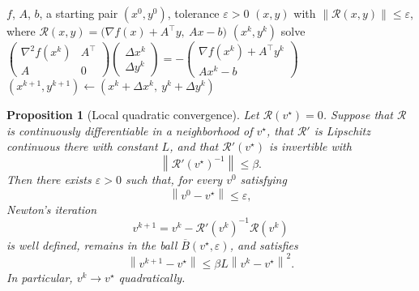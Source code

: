 \documentclass[a4paper,11pt]{book}
\theoremstyle{plain}
\newtheorem{proposition}[theorem]{Proposition}
\theoremstyle{definition}
\theoremstyle{remark}
\numberwithin{equation}{chapter}
\numberwithin{algorithm}{chapter}
\newcommand{\norm}[1]{\left\|#1\right\|}
\begin{document}
	\begin{algorithm}[H]
		\caption{Newton's method on the optimality conditions of the equality
			constrained problem}
		\begin{algorithmic}[1]
			\Require $f$, $A$, $b$, a starting pair $(x^0,y^0)$, tolerance $\varepsilon>0$
			\Ensure $(x,y)$ with $\norm{\mathcal{R}(x,y)}\leq\varepsilon$, where
			$\mathcal{R}(x,y)=\bigl(\nabla f(x)+A^\top y,\ Ax-b\bigr)$
			\If{$\norm{\mathcal{R}(x^k,y^k)}\leq\varepsilon$}
			\State \Return $(x^k,y^k)$ \EndIf
			\State solve
			$\begin{pmatrix}\nabla^2f(x^k)&A^\top\\ A&0\end{pmatrix}
			\begin{pmatrix}\Delta x^k\\ \Delta y^k\end{pmatrix}
			=-\begin{pmatrix}\nabla f(x^k)+A^\top y^k\\ Ax^k-b\end{pmatrix}$
			\State $(x^{k+1},y^{k+1})\gets(x^k+\Delta x^k,\ y^k+\Delta y^k)$
			\EndFor
		\end{algorithmic}
	\end{algorithm}
	
	\begin{proposition}[Local quadratic convergence]
		Let \(\mathcal R(v^\star)=0\). Suppose that \(\mathcal R\) is continuously
		differentiable in a neighborhood of \(v^\star\), that \(\mathcal R'\) is
		Lipschitz continuous there with constant \(L\), and that
		\(\mathcal R'(v^\star)\) is invertible with
		\[
		\norm{\mathcal R'(v^\star)^{-1}}\leq\beta.
		\]
		Then there exists \(\varepsilon>0\) such that, for every \(v^0\) satisfying
		\[
		\norm{v^0-v^\star}\leq\varepsilon,
		\]
		Newton's iteration
		\[
		v^{k+1}
		=
		v^k-\mathcal R'(v^k)^{-1}\mathcal R(v^k)
		\]
		is well defined, remains in the ball
		\(\overline B(v^\star,\varepsilon)\), and satisfies
		\begin{equation}
			\norm{v^{k+1}-v^\star}
			\leq
			\beta L\norm{v^k-v^\star}^2.
		\end{equation}
		In particular, \(v^k\to v^\star\) quadratically.
	\end{proposition}
	
\end{document}
